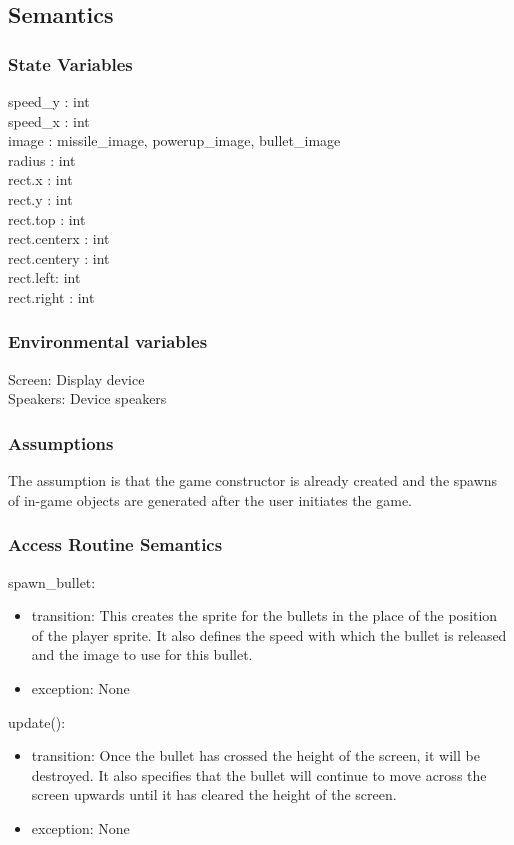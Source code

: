 \documentclass[12pt, titlepage]{article}
\begin{document}
\subsection {Semantics}

\subsubsection {State Variables}
speed\_y : int
\\speed\_x : int
\\image : missile\_image, powerup\_image, bullet\_image
\\radius : int
\\rect.x : int
\\rect.y : int
\\rect.top : int
\\rect.centerx : int
\\rect.centery : int
\\rect.left: int
\\rect.right : int

\subsubsection {Environmental variables}
Screen: Display device
\\Speakers: Device speakers 

\subsubsection {Assumptions}
The assumption is that the game constructor is already created and the spawns of in-game objects are generated after the user initiates the game. 

\subsubsection {Access Routine Semantics}
\noindent spawn\_bullet: 
\begin{itemize}
\item transition: This creates the sprite for the bullets in the place of the position of the player sprite. It also defines the speed with which the bullet is released and the image to use for this bullet.
\item exception: None
\end{itemize}

\noindent update():
\begin{itemize}
\item transition: Once the bullet has crossed the height of the screen, it will be destroyed. It also specifies that the bullet will continue to move across the screen upwards until it has cleared the height of the screen.
\item exception: None
\end{itemize}
\end{document}

